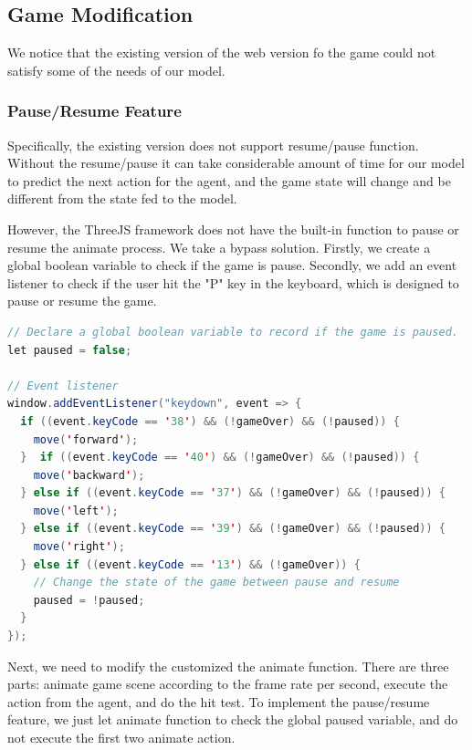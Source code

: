 \documentclass{article}
\begin{document}
\subsection{Game Modification}
We notice that the existing version of the web version fo the game could not satisfy some of the needs of our model. 

\subsubsection{Pause/Resume Feature}
Specifically, the existing version does not support resume/pause function. Without the resume/pause  it can take considerable amount of time for our model to predict the next action for the agent, and the game state will change and be different from the state fed to the model. \par 

However, the ThreeJS framework does not have the built-in function to pause or resume the animate process. We take a bypass solution. Firstly, we create a global boolean variable to check if the game is pause. Secondly, we add an event listener to check if the user hit the "P" key in the keyboard, which is designed to pause or resume the game.

\begin{lstlisting}[language = Java]
// Declare a global boolean variable to record if the game is paused. 
let paused = false;

// Event listener
window.addEventListener("keydown", event => {
  if ((event.keyCode == '38') && (!gameOver) && (!paused)) {
    move('forward');
  }  if ((event.keyCode == '40') && (!gameOver) && (!paused)) {
    move('backward');
  } else if ((event.keyCode == '37') && (!gameOver) && (!paused)) {
    move('left');
  } else if ((event.keyCode == '39') && (!gameOver) && (!paused)) {
    move('right');
  } else if ((event.keyCode == '13') && (!gameOver)) {
    // Change the state of the game between pause and resume
    paused = !paused;
  }
});
\end{lstlisting}

Next, we need to modify the customized the animate function. There are three parts: animate game scene according to the frame rate per second, execute the action from the agent, and do the hit test. To implement the pause/resume feature, we just let animate function to check the global paused variable, and do not execute the first two animate action. 
\end{document}
